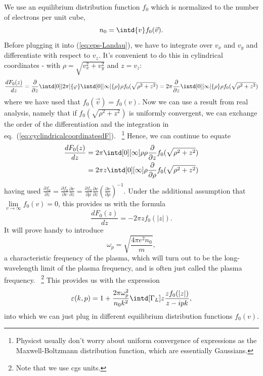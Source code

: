 \documentclass[physics,phd,nolot,nolof]{uccthesis}%
\begin{document}
We use an equilibrium distribution function $f_0$ which is normalized to the number of electrons per unit cube, 
\begin{equation}
  n_0=\intd{v} f_0(\vec v).
	\label{eq:fnormalization}
\end{equation}
Before plugging it into (\ref{eq:eps-Landau}), we have to integrate over $v_x$ and $v_y$ and differentiate with respect to $v_z$. 
It's convenient to do this in cylindrical coordinates - with  $\rho=\sqrt{v_x^2+v_y^2}$ and $z=v_z$:
\begin{equation}
  \frac{d F_0(z)}{d z}
  =\frac{\partial }{\partial z} \intd[0][2\pi]{\varphi}\intd[0][\infty]{\rho} \rho f_0(\sqrt{\rho^2 +z^2}) 
  =2\pi \frac{\partial }{\partial z}\intd[0][\infty]{\rho} \rho f_0(\sqrt{\rho^2 +z^2}) 
	\label{eq:cyclindricalcoordinatesdF}
\end{equation}
where we have used that $f_0(\vec v)=f_0(v)$.
Now we can use a result from real analysis, namely that if $ f_0(\sqrt{\rho^2 +z^2})$ is uniformly convergent,
we can exchange the order of the differentiation and the integration in eq.~(\ref{eq:cyclindricalcoordinatesdF}).~%
\footnote{Physicst usually don't worry about uniform convergence of expressions as the Maxwell-Boltzmann distribution function, which are essentially Gaussians.}
Hence, we can continue to equate 
\begin{equation}
	\begin{split}
	\frac{d F_0(z)}{d z}
	&=2\pi \intd[0][\infty]\rho\rho\frac{\partial}{\partial z}f_0(\sqrt{\rho^2 +z^2})\\ 
	&=2\pi z \intd[0][\infty]\rho\frac{\partial}{\partial \rho}f_0(\sqrt{\rho^2 +z^2}) 
	\end{split}
	\label{eq:cyclindricalcoordinatesdF2}
\end{equation}
having used $\frac{\partial f_0}{\partial z}=\frac{\partial f_0}{\partial v} \frac{\partial v}{\partial z}=\frac{\partial f_0}{\partial \rho}\frac{\partial v}{\partial z} \left(\frac{\partial v}{\partial \rho}\right)^{-1}$.
Under the additional assumption that $\lim\limits_{v\to\infty} f_0(v)= 0$, this provides us with the formula 
\begin{equation}
	\frac{d F_0(z)}{d z}=-2\pi z f_0(|z|).
	\label{eq:cyclindricalcoordinatesdF3}
\end{equation}
It will prove handy to introduce
\begin{equation}
	\omega_p=\sqrt{\frac{4\pi e^2 n_0}{m}},
	\label{eq:wp}
\end{equation} 
a characteristic frequency of the plasma, which will turn out to be the long-wavelength limit of the plasma frequency,
and is often just called the plasma frequency.~%
\footnote{Note that we use cgs units.}
This provides us with the expression
\begin{equation}
\varepsilon(k,p)=1+\frac{2\pi\omega_p^2}{n_0 k^2}
\intd[\Gamma_L]z\frac{z f_0(|z|)}{z-ipk},
\label{eq:eps-Landau-2}
\end{equation}
into which we can just plug in different equilibrium distribution functions $f_0(v)$.
\end{document}
